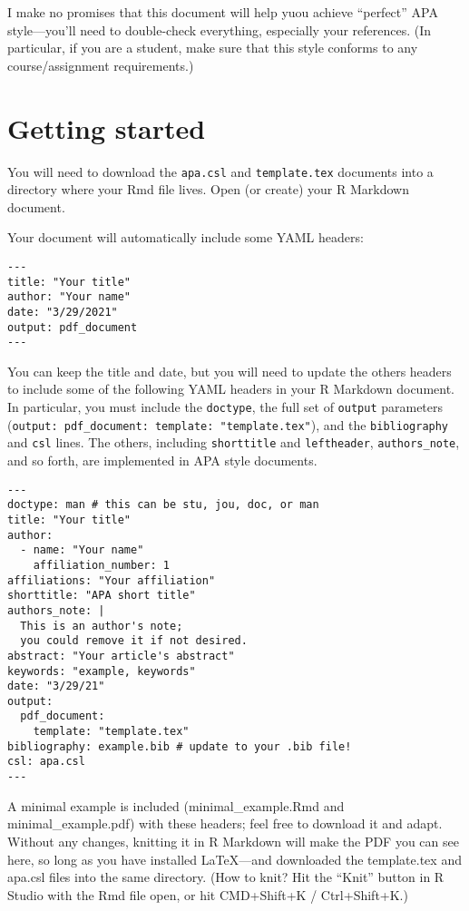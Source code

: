 \documentclass[jou]{apa7}
\begin{document}
I make no promises that this document will help yuou achieve ``perfect''
APA style---you'll need to double-check everything, especially your
references. (In particular, if you are a student, make sure that this
style conforms to any course/assignment requirements.)

\hypertarget{getting-started}{%
\section{Getting started}\label{getting-started}}

You will need to download the \texttt{apa.csl} and \texttt{template.tex}
documents into a directory where your Rmd file lives. Open (or create)
your R Markdown document.

Your document will automatically include some YAML headers:

\begin{verbatim}
---
title: "Your title"
author: "Your name"
date: "3/29/2021"
output: pdf_document
---
\end{verbatim}

You can keep the title and date, but you will need to update the others
headers to include some of the following YAML headers in your R Markdown
document. In particular, you must include the \texttt{doctype}, the full
set of \texttt{output} parameters
(\texttt{output:\ pdf\_document:\ template:\ "template.tex"}), and the
\texttt{bibliography} and \texttt{csl} lines. The others, including
\texttt{shorttitle} and \texttt{leftheader}, \texttt{authors\_note}, and
so forth, are implemented in APA style documents.

\begin{verbatim}
---
doctype: man # this can be stu, jou, doc, or man
title: "Your title"
author: 
  - name: "Your name"
    affiliation_number: 1
affiliations: "Your affiliation"
shorttitle: "APA short title"
authors_note: |
  This is an author's note; 
  you could remove it if not desired. 
abstract: "Your article's abstract"
keywords: "example, keywords"
date: "3/29/21"
output: 
  pdf_document:
    template: "template.tex"
bibliography: example.bib # update to your .bib file!
csl: apa.csl
---
\end{verbatim}

A minimal example is included (minimal\_example.Rmd and
minimal\_example.pdf) with these headers; feel free to download it and
adapt. Without any changes, knitting it in R Markdown will make the PDF
you can see here, so long as you have installed LaTeX---and downloaded
the template.tex and apa.csl files into the same directory. (How to
knit? Hit the ``Knit'' button in R Studio with the Rmd file open, or hit
CMD+Shift+K / Ctrl+Shift+K.)
\end{document}
